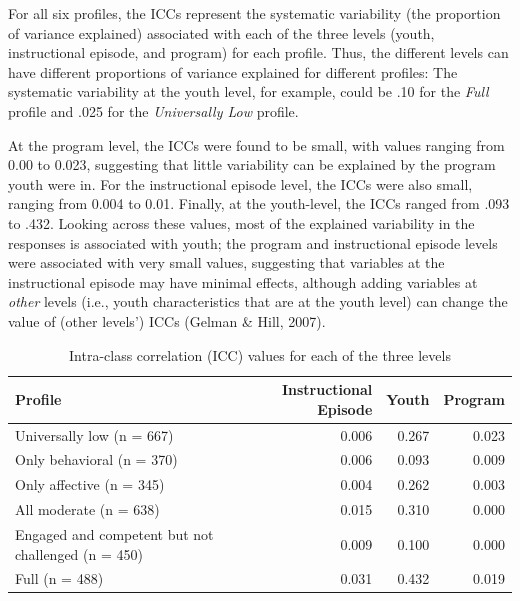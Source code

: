 \documentclass[]{msu-thesis}
\theoremstyle{definition}
\theoremstyle{definition}
\theoremstyle{definition}
\theoremstyle{remark}
\begin{document}
For all six profiles, the ICCs represent the systematic variability (the
proportion of variance explained) associated with each of the three
levels (youth, instructional episode, and program) for each profile.
Thus, the different levels can have different proportions of variance
explained for different profiles: The systematic variability at the
youth level, for example, could be .10 for the \emph{Full} profile and
.025 for the \emph{Universally Low} profile.

At the program level, the ICCs were found to be small, with values
ranging from 0.00 to 0.023, suggesting that little variability can be
explained by the program youth were in. For the instructional episode
level, the ICCs were also small, ranging from 0.004 to 0.01. Finally, at
the youth-level, the ICCs ranged from .093 to .432. Looking across these
values, most of the explained variability in the responses is associated
with youth; the program and instructional episode levels were associated
with very small values, suggesting that variables at the instructional
episode may have minimal effects, although adding variables at
\emph{other} levels (i.e., youth characteristics that are at the youth
level) can change the value of (other levels') ICCs (Gelman \& Hill,
2007).

\begin{table}

\caption{\label{tab:unnamed-chunk-13}Intra-class correlation (ICC) values for each of the three levels}
\centering
\begin{tabular}[t]{lrrr}
\toprule
Profile & Instructional Episode & Youth & Program\\
\midrule
Universally low (n = 667) & 0.006 & 0.267 & 0.023\\
Only behavioral (n = 370) & 0.006 & 0.093 & 0.009\\
Only affective (n = 345) & 0.004 & 0.262 & 0.003\\
All moderate (n = 638) & 0.015 & 0.310 & 0.000\\
Engaged and competent but not challenged (n = 450) & 0.009 & 0.100 & 0.000\\
Full (n = 488) & 0.031 & 0.432 & 0.019\\
\bottomrule
\end{tabular}
\end{table}
\end{document}

